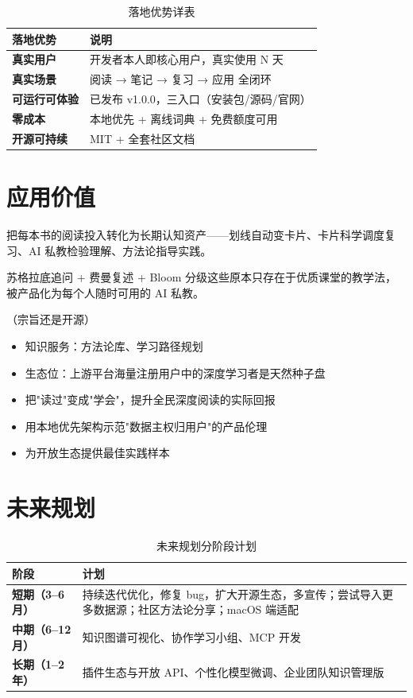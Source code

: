 \documentclass[12pt,a4paper,nomath]{harryopo-report}
\begin{document}
\begin{table}[htbp]
\centering
\begin{tabularx}{\textwidth}{>{\bfseries}l X}
\toprule
\textbf{落地优势} & \textbf{说明} \\
\midrule
真实用户 & 开发者本人即核心用户，真实使用 N 天 \\
真实场景 & 阅读 → 笔记 → 复习 → 应用 全闭环 \\
可运行可体验 & 已发布 v1.0.0，三入口（安装包/源码/官网） \\
零成本 & 本地优先 + 离线词典 + 免费额度可用 \\
开源可持续 & MIT + 全套社区文档 \\
\bottomrule
\end{tabularx}
\caption{落地优势详表}
\label{tab:landing}
\end{table}
\fi

\ifshowvalue
\section{应用价值}
把每本书的阅读投入转化为长期认知资产——划线自动变卡片、卡片科学调度复习、AI 私教检验理解、方法论指导实践。

苏格拉底追问 + 费曼复述 + Bloom 分级这些原本只存在于优质课堂的教学法，被产品化为每个人随时可用的 AI 私教。

（宗旨还是开源）
\begin{itemize}
    \item 知识服务：方法论库、学习路径规划
    \item 生态位：上游平台海量注册用户中的深度学习者是天然种子盘
\end{itemize}

\begin{itemize}
    \item 把"读过"变成"学会"，提升全民深度阅读的实际回报
    \item 用本地优先架构示范"数据主权归用户"的产品伦理
    \item 为开放生态提供最佳实践样本
\end{itemize}
\fi

\ifshowfuture
\section{未来规划}
\begin{table}[htbp]
\centering
\begin{tabularx}{\textwidth}{>{\bfseries}l X}
\toprule
\textbf{阶段} & \textbf{计划} \\
\midrule
短期（3--6 月） & 持续迭代优化，修复 bug，扩大开源生态，多宣传；尝试导入更多数据源；社区方法论分享；macOS 端适配 \\
中期（6--12 月） & 知识图谱可视化、协作学习小组、MCP 开发 \\
长期（1--2 年） & 插件生态与开放 API、个性化模型微调、企业团队知识管理版 \\
\bottomrule
\end{tabularx}
\caption{未来规划分阶段计划}
\label{tab:future}
\end{table}
\fi
\end{document}
